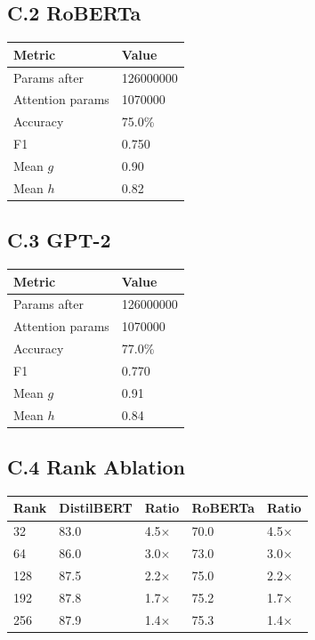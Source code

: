 \subsection{C.2 RoBERTa}

\begin{table}[H]
\centering
\small
\begin{tabular}{ll}
\toprule
\textbf{Metric} & \textbf{Value} \\
\midrule
Params after & 126000000 \\
Attention params & 1070000 \\
Accuracy & 75.0\% \\
F1 & 0.750 \\
Mean $g$ & 0.90 \\
Mean $h$ & 0.82 \\
\bottomrule
\end{tabular}
\end{table}

\subsection{C.3 GPT-2}

\begin{table}[H]
\centering
\small
\begin{tabular}{ll}
\toprule
\textbf{Metric} & \textbf{Value} \\
\midrule
Params after & 126000000 \\
Attention params & 1070000 \\
Accuracy & 77.0\% \\
F1 & 0.770 \\
Mean $g$ & 0.91 \\
Mean $h$ & 0.84 \\
\bottomrule
\end{tabular}
\end{table}

\subsection{C.4 Rank Ablation}

\begin{table}[H]
\centering
\small
\begin{tabular}{lllll}
\toprule
\textbf{Rank} & \textbf{DistilBERT} & \textbf{Ratio} & \textbf{RoBERTa} & \textbf{Ratio} \\
\midrule
32 & 83.0 & 4.5$\times$ & 70.0 & 4.5$\times$ \\
64 & 86.0 & 3.0$\times$ & 73.0 & 3.0$\times$ \\
128 & 87.5 & 2.2$\times$ & 75.0 & 2.2$\times$ \\
192 & 87.8 & 1.7$\times$ & 75.2 & 1.7$\times$ \\
256 & 87.9 & 1.4$\times$ & 75.3 & 1.4$\times$ \\
\bottomrule
\end{tabular}
\end{table}

